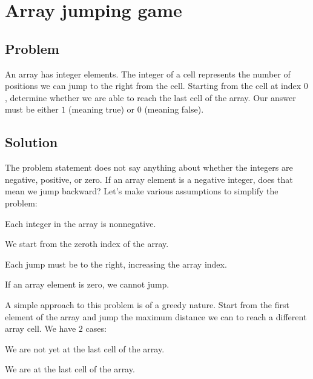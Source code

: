 
\section{Array jumping game}
\label{sec:array_jumping_game}



\subsection*{Problem}

An array has integer elements.  The integer of a cell represents the
number of positions we can jump to the right from the cell.  Starting
from the cell at index $0$, determine whether we are able to reach the
last cell of the array.  Our answer must be either $1$ (meaning true)
or $0$ (meaning false).



\subsection*{Solution}

The problem statement does not say anything about whether the integers
are negative, positive, or zero.  If an array element is a negative
integer, does that mean we jump backward?  Let's make various
assumptions to simplify the problem:

\begin{packedenumeral}
\item Each integer in the array is nonnegative.
\item We start from the zeroth index of the array.
\item Each jump must be to the right, increasing the array index.
\item If an array element is zero, we cannot jump.
\end{packedenumeral}

A simple approach to this problem is of a greedy nature.  Start from
the first element of the array and jump the maximum distance we can to
reach a different array cell.  We have $2$ cases:

\begin{packedenumeral}
\item We are not yet at the last cell of the array.

\item We are at the last cell of the array.
\end{packedenumeral}

